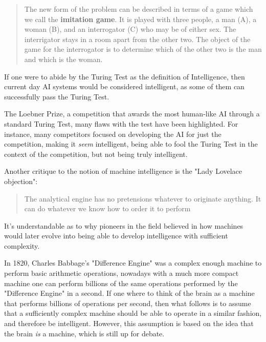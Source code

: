 \begin{quote}
	The new form of the problem can be described in terms of a game which
	we call the \textbf{imitation game}. It is played with three people, a man
	(A), a woman (B), and an interrogator (C) who may be of either sex. The
	interrigator stays in a room apart from the other two. The object of the game
	for the interrogator is to determine which of the other two is the man and
	which is the woman\cite{10.1093/mind/LIX.236.433}.
\end{quote}

\par
If one were to abide by the Turing Test as the definition of Intelligence, then
current day AI systems would be considered intelligent, as some of them can
successfully pass the Turing Test.

\par
The Loebner Prize, a competition that awards the most human-like AI through a
standard Turing Test, many flaws with the test have been highlighted. For
instance, many competitors focused on developing the AI for just the
competition, making it \textit{seem} intelligent, being able to fool the Turing
Test in the context of the competition, but not being truly intelligent.

\par
Another critique to the notion of machine intelligence is the "Lady Lovelace
objection":

\begin{quote}
	The analytical engine has no pretensions whatever to originate anything. It
	can do whatever we know how to order it to perform
\end{quote}

\par
It's understandable as to why pioneers in the field believed in how machines
would later evolve into being able to develop intelligence with sufficient
complexity.

\par
In 1820, Charles Babbage's "Difference Engine" was a complex enough
machine to perform basic arithmetic operations, nowadays with a much more
compact machine one can perform billions of the same operations performed by
the "Difference Engine" in a second. If one where to think of the brain as a
machine that performs billions of operations per second, then what follows is to
assume that a sufficiently complex machine should be able to operate in a
similar fashion, and therefore be intelligent. However, this assumption is based
on the idea that the brain \textit{is} a machine, which is still up for debate.

